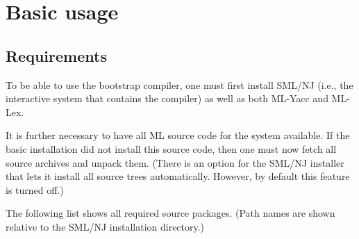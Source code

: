 %

\section{Basic usage}

\subsection{Requirements}

To be able to use the bootstrap compiler, one must first install
SML/NJ (i.e., the interactive system that contains the compiler) as
well as both ML-Yacc and ML-Lex.

It is further necessary to have all ML source code for the system
available.  If the basic installation did not install this source
code, then one must now fetch all source archives and unpack them.
(There is an option for the SML/NJ installer that lets it install all
source trees automatically.  However, by default this feature is turned
off.)

The following list shows all required source packages.  (Path names
are shown relative to the SML/NJ installation directory.)

